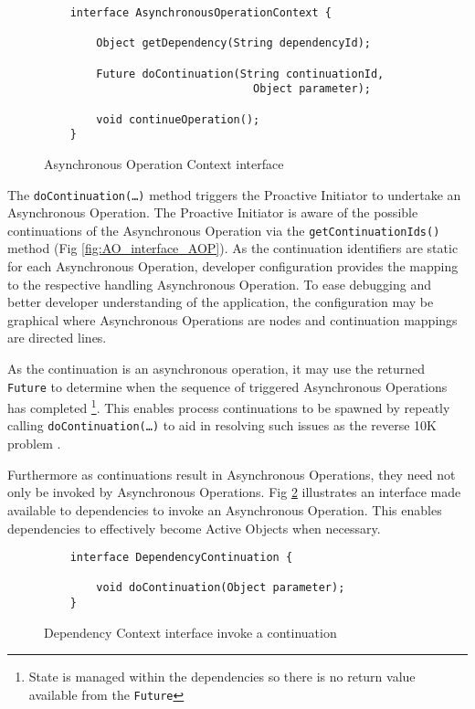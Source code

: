 \documentclass{article}
\begin{document}
\begin{figure}[!h]
\begin{verbatim}
    interface AsynchronousOperationContext {
    
        Object getDependency(String dependencyId);
        
        Future doContinuation(String continuationId, 
                                Object parameter);
        
        void continueOperation();
    }
\end{verbatim}
\caption[Caption for Code]{Asynchronous Operation Context interface \footnotemark}
\label{fig:AOC_interface}
\end{figure}

The \texttt{doContinuation(\ldots)} method triggers the Proactive Initiator to
undertake an Asynchronous Operation.  The Proactive Initiator is aware of the
possible continuations of the Asynchronous Operation via the
\texttt{getContinuationIds()} method (Fig \ref{fig:AO_interface_AOP}).  As the
continuation identifiers are static for each Asynchronous Operation, developer
configuration provides the mapping to the respective handling Asynchronous
Operation.  To ease debugging and better developer understanding of the
application, the configuration may be graphical where Asynchronous Operations
are nodes and continuation mappings are directed lines.

As the continuation is an asynchronous operation, it may use the returned
\texttt{Future} to determine when the sequence of triggered Asynchronous
Operations has completed \footnote{State is managed within the dependencies so
there is no return value available from the \texttt{Future}}.  This enables
process continuations \cite{process-continuation} to be spawned by repeatly
calling \texttt{doContinuation(\ldots)} to aid in resolving such issues as the
reverse 10K problem \cite{reverse-ten-k-problem}.

Furthermore as continuations result in Asynchronous Operations, they need not
only be invoked by Asynchronous Operations. Fig \ref{fig:DC_interface}
illustrates an interface made available to dependencies to invoke an
Asynchronous Operation.  This enables dependencies to effectively become Active
Objects \cite{active-object} when necessary.

\begin{figure}[!h]
\begin{verbatim}
    interface DependencyContinuation {
            
        void doContinuation(Object parameter);
    }
\end{verbatim}
\caption[Caption for Code]{Dependency Context interface invoke a continuation}
\label{fig:DC_interface}
\end{figure}
\end{document}
